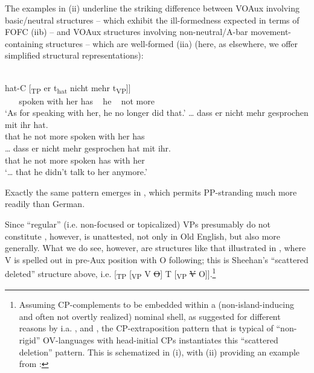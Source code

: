 \documentclass[output=paper]{LSP/langsci}
\begin{document}
{The  examples in (ii) underline the striking difference between VOAux involving basic/neutral structures – which exhibit the ill-formedness expected in terms of FOFC (iib) – and VOAux structures involving non-neutral/A-bar movement-containing structures – which are well-formed (iia) (here, as elsewhere, we offer simplified structural representations): 
\let\eachwordone\upshape
\begin{exe}
 \begin{xlista}
  \\ 
  \gll  [\textsubscript{CP} [\textsubscript{VP} \textbf{Gesprochen} \textbf{mit}  \textbf{ihr}]  hat-C [\textsubscript{TP} er  t\textsubscript{hat} nicht mehr t\textsubscript{VP}]]\\
             ~ ~    spoken          with her   has     ~     he    ~   not    more \\
                 \glt \upshape ‘As for speaking with her, he no longer did that.’
  \ex \gll * … dass er  nicht mehr gesprochen mit  ihr hat.\\
           {} {} that  he not    more spoken       with her has\\
  \ex \gll … dass er  nicht mehr gesprochen hat  mit  ihr.\\
           {}  that  he not     more  spoken       has with her\\
       \glt \upshape ‘… that he didn’t talk to her anymore.’    \upshape\citep[80]{Haider2013} 
 \end{xlista}
\end{exe}
Exactly the same pattern emerges in , which permits PP-stranding much more readily than {German}.}  Since “regular” (i.e. non-focused or topicalized) VPs presumably do not constitute , however,  is unattested, not only in Old English, but also more generally. What we do see, however, are structures like that illustrated in , where V is spelled out in pre-Aux position with O following; this is Sheehan’s “scattered deleted” structure  above, i.e. [\textsubscript{TP} [\textsubscript{VP} V \st{O}] T [\textsubscript{VP} \st{V} O]].\footnote{\label{fn:biberauer:11}Assuming
   CP-complements to be embedded within a (non-island-inducing and often not overtly realized) nominal shell, as suggested for different reasons by i.a. \citet{Kayne2008expletives,Arsenijević2009,Moulton2009,Moulton2013,Moulton2015,BiberauerSheehan2012},  and \citet{Franco2012}, the CP-extraposition pattern that is typical of “non-rigid” OV-languages with head-initial CPs instantiates this “scattered deletion” pattern. This is schematized in (i), with (ii) providing an example from :
}
\end{document}
